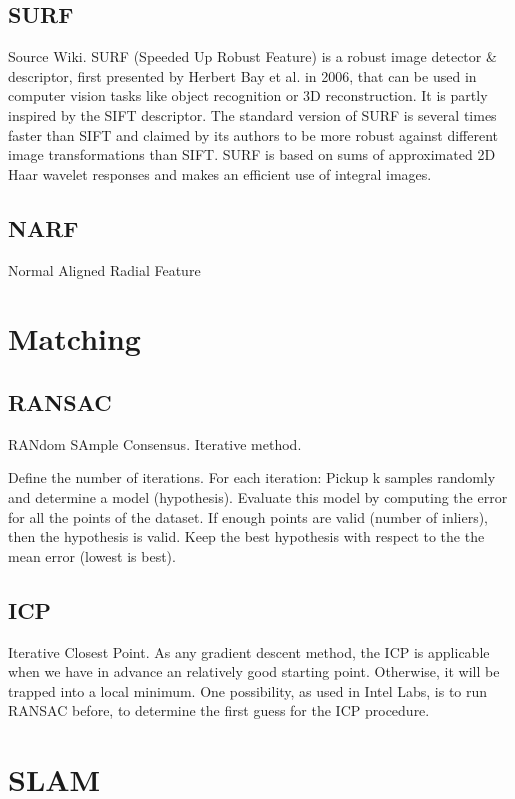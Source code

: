 \documentclass[a4paper,11pt]{kth-mag}
\begin{document}
\subsection{SURF}
Source Wiki.
SURF (Speeded Up Robust Feature) is a robust image detector \& descriptor, first presented by Herbert Bay et al. in 2006, that can be used in computer vision tasks like object recognition or 3D reconstruction. It is partly inspired by the SIFT descriptor. The standard version of SURF is several times faster than SIFT and claimed by its authors to be more robust against different image transformations than SIFT. SURF is based on sums of approximated 2D Haar wavelet responses and makes an efficient use of integral images.

\subsection{NARF}
Normal Aligned Radial Feature

\section{Matching}

\subsection{RANSAC}
RANdom SAmple Consensus. Iterative method.

Define the number of iterations.
For each iteration:
Pickup k samples randomly and determine a model (hypothesis). Evaluate this model by computing the error for all the points of the dataset. If enough points are valid (number of inliers), then the hypothesis is valid. Keep the best hypothesis with respect to the the mean error (lowest is best).

\subsection{ICP}
Iterative Closest Point. As any gradient descent method, the ICP is applicable when we have in advance an relatively good starting point. Otherwise, it will be trapped into a local minimum. One possibility, as used in Intel Labs, is to run RANSAC before, to determine the first guess for the ICP procedure.

\section{SLAM}
\end{document}
